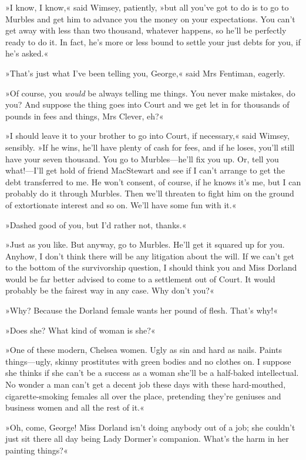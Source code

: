 »I know, I know,« said Wimsey, patiently, »but all you've got to do is to go to Murbles and get him to advance you the money on your expectations. You can't get away with less than two thousand, whatever happens, so he'll be perfectly ready to do it. In fact, he's more or less bound to settle your just debts for you, if he's asked.«

»That's just what I've been telling you, George,« said Mrs Fentiman, eagerly.

»Of course, you \textit{would} be always telling me things. You never make mistakes, do you? And suppose the thing goes into Court and we get let in for thousands of pounds in fees and things, Mrs Clever, eh?«

»I should leave it to your brother to go into Court, if necessary,« said Wimsey, sensibly. »If he wins, he'll have plenty of cash for fees, and if he loses, you'll still have your seven thousand. You go to Murbles—he'll fix you up. Or, tell you what!—I'll get hold of friend MacStewart and see if I can't arrange to get the debt transferred to me. He won't consent, of course, if he knows it's me, but I can probably do it through Murbles. Then we'll threaten to fight him on the ground of extortionate interest and so on. We'll have some fun with it.«

»Dashed good of you, but I'd rather not, thanks.«

»Just as you like. But anyway, go to Murbles. He'll get it squared up for you. Anyhow, I don't think there will be any litigation about the will. If we can't get to the bottom of the survivorship question, I should think you and Miss Dorland would be far better advised to come to a settlement out of Court. It would probably be the fairest way in any case. Why don't you?«

»Why? Because the Dorland female wants her pound of flesh. That's why!«

»Does she? What kind of woman is she?«

»One of these modern, Chelsea women. Ugly as sin and hard as nails. Paints things—ugly, skinny prostitutes with green bodies and no clothes on. I suppose she thinks if she can't be a success as a woman she'll be a half-baked intellectual. No wonder a man can't get a decent job these days with these hard-mouthed, cigarette-smoking females all over the place, pretending they're geniuses and business women and all the rest of it.«

»Oh, come, George! Miss Dorland isn't doing anybody out of a job; she couldn't just sit there all day being Lady Dormer's companion. What's the harm in her painting things?«

